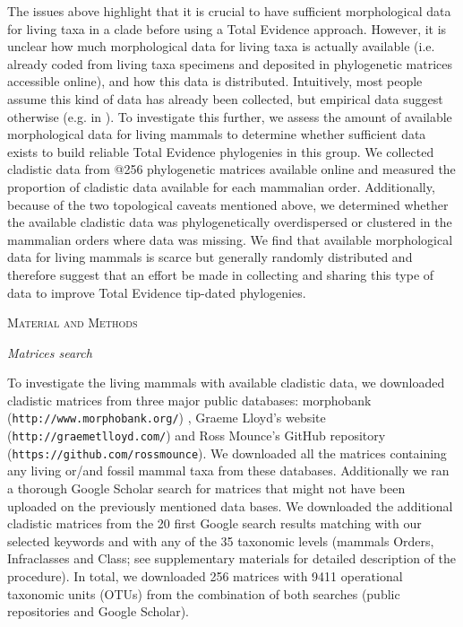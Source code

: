 \documentclass[12pt,letterpaper]{article}
\renewcommand{\section}[1]{%
\bigskip
\begin{center}
\begin{Large}
\normalfont\scshape #1
\medskip
\end{Large}
\end{center}}
\renewcommand{\subsection}[1]{%
\bigskip
\begin{center}
\begin{large}
\normalfont\itshape #1
\end{large}
\end{center}}
\begin{document}
The issues above highlight that it is crucial to have sufficient morphological data for living taxa in a clade before using a Total Evidence approach.
However, it is unclear how much morphological data for living taxa is actually available (i.e. already coded from living taxa specimens and deposited in phylogenetic matrices accessible online), and how this data is distributed.
Intuitively, most people assume this kind of data has already been collected, but empirical data suggest otherwise (e.g. in \cite{ronquista2012,slaterphylogenetic2013,beckancient2014}).
To investigate this further, we assess the amount of available morphological data for living mammals to determine whether sufficient data exists to build reliable Total Evidence phylogenies in this group.
We collected cladistic data from @256 phylogenetic matrices available online and measured the proportion of cladistic data available for each mammalian order.
Additionally, because of the two topological caveats mentioned above, we determined whether the available cladistic data was phylogenetically overdispersed or clustered in the mammalian orders where data was missing. 
We find that available morphological data for living mammals is scarce but generally randomly distributed and therefore suggest that an effort be made in collecting and sharing this type of data to improve Total Evidence tip-dated phylogenies.


%
%
 

\section{Material and Methods}
\subsection{Matrices search}
To investigate the living mammals with available cladistic data, we downloaded cladistic matrices from three major public databases: morphobank (\texttt{http://www.morphobank.org/}) \citep{morphobank}, Graeme Lloyd's website (\texttt{http://graemetlloyd.com/}) and Ross Mounce's GitHub repository (\texttt{https://github.com/rossmounce}).
We downloaded all the matrices containing any living or/and fossil mammal taxa from these databases.
Additionally we ran a thorough Google Scholar search for matrices that might not have been uploaded on the previously mentioned data bases.
We downloaded the additional cladistic matrices from the 20 first Google search results matching with our selected keywords and with any of the 35 taxonomic levels (mammals Orders, Infraclasses and Class; see supplementary materials for detailed description of the procedure).
In total, we downloaded 256 %
matrices with 9411 %
operational taxonomic units (OTUs) from the combination of both searches (public repositories and Google Scholar). %
\end{document}

